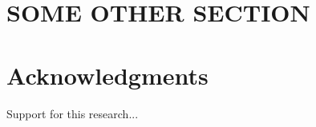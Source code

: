 \documentclass[12pt,twocolumn]{article}
\begin{document}

\section{SOME OTHER SECTION}

\Blindtext


\section*{Acknowledgments}
Support for this research...





\end{document}
